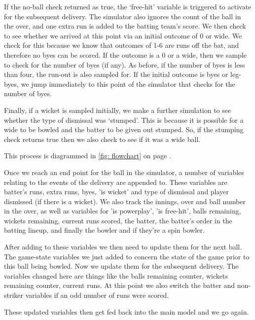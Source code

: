 If the no-ball check returned as true, the ‘free-hit’ variable is triggered to activate for the subsequent delivery. The simulator also ignores the count of the ball in the over, and one extra run is added to the batting team’s score. We then check to see whether we arrived at this point via an initial outcome of 0 or wide. We check for this because we know that outcomes of 1-6 are runs off the bat, and therefore no byes can be scored. If the outcome is a 0 or a wide, then we sample to check for the number of byes (if any). As before, if the number of byes is less than four, the run-out is also sampled for. If the initial outcome is byes or leg-byes, we jump immediately to this point of the simulator that checks for the number of byes.

Finally, if a wicket is sampled initially, we make a further simulation to see whether the type of dismissal was ‘stumped’. This is because it is possible for a wide to be bowled and the batter to be given out stumped. So, if the stumping check returns true then we also check to see if it was a wide ball.

This process is diagrammed in \cref{fig: flowchart} on page \pageref{fig: flowchart}.

Once we reach an end point for the ball in the simulator, a number of variables relating to the events of the delivery are appended to. These variables are batter's runs, extra runs, byes, 'is wicket' and type of dismissal and player dismissed (if there is a wicket). We also track the innings, over and ball number in the over, as well as variables for 'is powerplay', 'is free-hit', balls remaining, wickets remaining, current runs scored, the batter, the batter's order in the batting lineup, and finally the bowler and if they're a spin bowler.

After adding to these variables we then need to update them for the next ball. The game-state variables we just added to concern the state of the game prior to this ball being bowled. Now we update them for the subsequent delivery. The variables changed here are things like the balls remaining counter, wickets remaining counter, current runs. At this point we also switch the batter and non-striker variables if an odd number of runs were scored.

These updated variables then get fed back into the main model and we go again.

